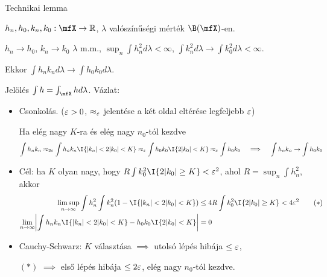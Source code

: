 \documentclass[aspectratio=169,notheorems,9pt,\option]{beamer}
\begin{document}
\begin{frame}{Technikai lemma}
  \begin{lemma}
    $h_n,h_0,k_n,k_0:\mfX\to\real$, $\lambda$ valószínűségi mérték $\B(\mfX)$-en.

    $h_n\to h_0$, $k_n\to k_0$ $\lambda$ m.m., 
    $\sup_n \int h_n^2d\lambda<\infty$, 
    $\int k_n^2d\lambda\to\int k_0^2d\lambda<\infty$.
    
    Ekkor $\int h_nk_nd\lambda\to\int h_0k_0d\lambda$.
  \end{lemma}
  Jelölés $\int h=\int_{\mfX} h d\lambda$. Vázlat:
  \begin{itemize}
    \item Csonkolás. ($\varepsilon>0$, $\approx_\varepsilon$ jelentése a két oldal eltérése legfeljebb $\varepsilon$) 
    
    Ha elég nagy $K$-ra és elég nagy $n_0$-tól kezdve
    \begin{displaymath}
      \int h_n k_n
      \approx_{2\eps}
      \int h_n k_n\I{\abs{k_n}<2\abs{k_0}<K}
      \approx_{\eps} 
      \int h_0 k_0\I{2\abs{k_0}<K}
      \approx_\eps 
      \int h_0k_0
      \quad\implies\quad \int h_n k_n\to\int h_0k_0
    \end{displaymath}
    \item Cél: ha $K$ olyan nagy, hogy $R\int k_0^2\I{2\abs{k_0}\geq K}<\eps^2$, ahol $R=\sup_n\int h_n^2$, akkor 
    \begin{align*}
      \limsup_{n\to\infty} \int h_n^2\int k^2_n(1-\I{\abs{k_n}<2\abs{k_0}<K}) &\leq 4R\int k_0^2\I{2\abs{k_0}\geq K}<4\eps^2 \tag{$*$}\\
      \lim_{n\to\infty} \abs*{\int h_n k_n\I{\abs{k_n}<2\abs{k_0}<K}-h_0 k_0\I{2\abs{k_0}<K}}&=0
    \end{align*}
    \item Cauchy-Schwarz: $K$ választása $\implies$ utolsó lépés hibája $\leq\varepsilon$,

    \hphantom{Cauchy-Schwarz: }$(*)$ $\implies$ első lépés hibája $\leq 2\varepsilon$,  elég nagy $n_0$-tól kezdve.


    

\end{itemize}
\end{frame}
\end{document}
